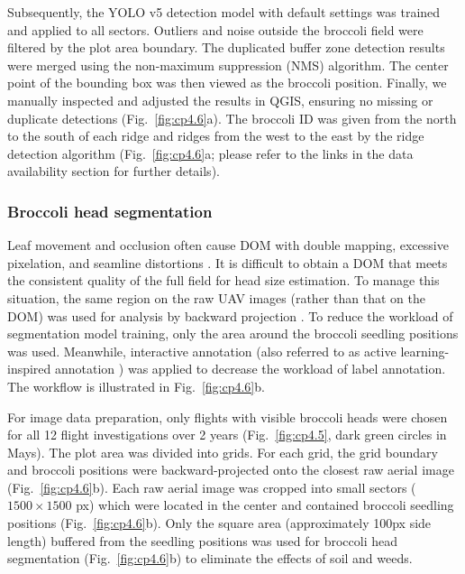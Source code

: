 Subsequently, the YOLO v5 detection model with default settings was trained and applied to all sectors. Outliers and noise outside the broccoli field were filtered by the plot area boundary. The duplicated buffer zone detection results were merged using the non-maximum suppression (NMS) algorithm. The center point of the bounding box was then viewed as the broccoli position. Finally, we manually inspected and adjusted the results in QGIS, ensuring no missing or duplicate detections (Fig.~\ref{fig:cp4.6}a). The broccoli ID was given from the north to the south of each ridge and ridges from the west to the east by the ridge detection algorithm (Fig.~\ref{fig:cp4.6}a; please refer to the links in the data availability section for further details). 

\subsubsection*{Broccoli head segmentation}

Leaf movement and occlusion often cause DOM with double mapping, excessive pixelation, and seamline distortions \citep{lin_new_2021}. It is difficult to obtain a DOM that meets the consistent quality of the full field for head size estimation. To manage this situation, the same region on the raw UAV images (rather than that on the DOM) was used for analysis by backward projection \citep{wang_easyidp_2021}. To reduce the workload of segmentation model training, only the area around the broccoli seedling positions was used. Meanwhile, interactive annotation (also referred to as active learning-inspired annotation \citep{ghosal_weakly_2019}) was applied to decrease the workload of label annotation. The workflow is illustrated in Fig.~\ref{fig:cp4.6}b.

For image data preparation, only flights with visible broccoli heads were chosen for all 12 flight investigations over 2 years (Fig.~\ref{fig:cp4.5}, dark green circles in Mays). The plot area was divided into grids. For each grid, the grid boundary and broccoli positions were backward-projected onto the closest raw aerial image (Fig.~\ref{fig:cp4.6}b). Each raw aerial image was cropped into small sectors ($1500 \times 1500$ px) which were located in the center and contained broccoli seedling positions (Fig.~\ref{fig:cp4.6}b). Only the square area (approximately 100px side length) buffered from the seedling positions was used for broccoli head segmentation (Fig.~\ref{fig:cp4.6}b) to eliminate the effects of soil and weeds.


